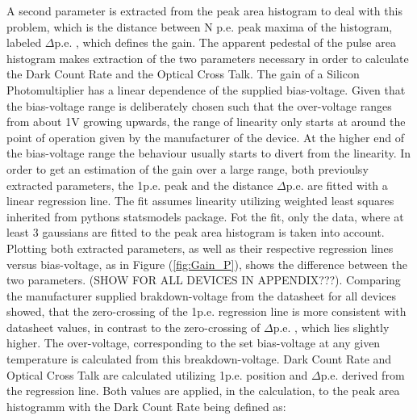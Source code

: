 \documentclass[12pt,article,type=msc,colorback,accentcolor=tud9c]{tudthesis}
\begin{document}
\begin{wrapfigure}{R}{0.45\textwidth}
\centering
\texttt{[image: D:/OwnCloudData/00\_WriteUp/04\_Thesis/Pic/GainFit/\{GainFit\_delta\_pe]}.png}
\caption{\label{fig:Gain_P}1p.e. position and $\Delta$p.e. extracted from the Pulse Area histogram at every bias-voltage for HPK S12642 with their respective regression lines.}
\end{wrapfigure} A second parameter is extracted from the peak area histogram to deal with this problem, which is the distance between N p.e. peak maxima of the histogram, labeled $\Delta$p.e. , which defines the gain. The apparent pedestal of the pulse area histogram makes extraction of the two parameters necessary in order to calculate the Dark Count Rate and the Optical Cross Talk. The gain of a Silicon Photomultiplier has a linear dependence of the supplied bias-voltage. Given that the bias-voltage range is deliberately chosen such that the over-voltage ranges from about 1V growing upwards, the range of linearity only starts at around the point of operation given by the manufacturer of the device. At the higher end of the bias-voltage range the behaviour usually starts to divert from the linearity. In order to get an estimation of the gain over a large range, both previoulsy extracted parameters, the 1p.e. peak and the distance $\Delta$p.e. are fitted with a linear regression line. The fit assumes linearity utilizing weighted least squares inherited from pythons statsmodels package. Fot the fit, only the data, where at least 3 gaussians are fitted to the peak area histogram is taken into account. Plotting both extracted parameters, as well as their respective regression lines versus bias-voltage, as in Figure (\ref{fig:Gain_P}), shows the difference between the two parameters. (SHOW FOR ALL DEVICES IN APPENDIX???). Comparing the manufacturer supplied brakdown-voltage from the datasheet for all devices showed, that the zero-crossing of the 1p.e. regression line is more consistent with datasheet values, in contrast to the zero-crossing of $\Delta$p.e. , which lies slightly higher. The over-voltage, corresponding to the set bias-voltage at any given temperature is calculated from this breakdown-voltage. 
Dark Count Rate and Optical Cross Talk are calculated utilizing 1p.e. position and $\Delta$p.e. derived from the regression line. Both values are applied, in the calculation, to the peak area histogramm with the Dark Count Rate being defined as:
\end{document}

